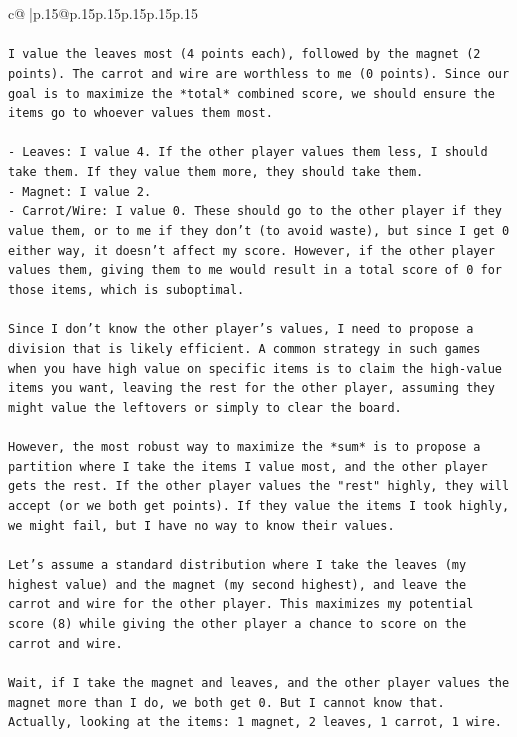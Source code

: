 \documentclass{article}
\begin{document}
{\begin{supertabular}{c@{$\;$}|p{.15\linewidth}@{}p{.15\linewidth}p{.15\linewidth}p{.15\linewidth}p{.15\linewidth}p{.15\linewidth}}
{{{\\ 
\\ 
\texttt{I value the leaves most (4 points each), followed by the magnet (2 points). The carrot and wire are worthless to me (0 points). Since our goal is to maximize the *total* combined score, we should ensure the items go to whoever values them most.} \\
\\ 
\texttt{{-} Leaves: I value 4. If the other player values them less, I should take them. If they value them more, they should take them.} \\
\texttt{{-} Magnet: I value 2.} \\
\texttt{{-} Carrot/Wire: I value 0. These should go to the other player if they value them, or to me if they don't (to avoid waste), but since I get 0 either way, it doesn't affect my score. However, if the other player values them, giving them to me would result in a total score of 0 for those items, which is suboptimal.} \\
\\ 
\texttt{Since I don't know the other player's values, I need to propose a division that is likely efficient. A common strategy in such games when you have high value on specific items is to claim the high{-}value items you want, leaving the rest for the other player, assuming they might value the leftovers or simply to clear the board.} \\
\\ 
\texttt{However, the most robust way to maximize the *sum* is to propose a partition where I take the items I value most, and the other player gets the rest. If the other player values the "rest" highly, they will accept (or we both get points). If they value the items I took highly, we might fail, but I have no way to know their values.} \\
\\ 
\texttt{Let's assume a standard distribution where I take the leaves (my highest value) and the magnet (my second highest), and leave the carrot and wire for the other player. This maximizes my potential score (8) while giving the other player a chance to score on the carrot and wire.} \\
\\ 
\texttt{Wait, if I take the magnet and leaves, and the other player values the magnet more than I do, we both get 0. But I cannot know that.} \\
\texttt{Actually, looking at the items: 1 magnet, 2 leaves, 1 carrot, 1 wire.} \\
}}}
\end{supertabular}}
\end{document}
